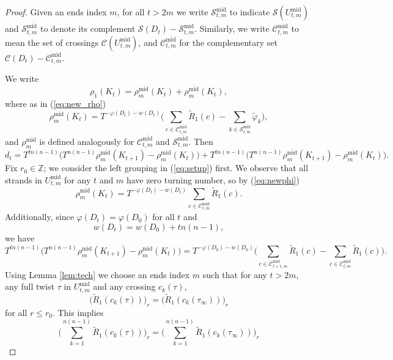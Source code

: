 \documentclass[10pt,a4paper]{amsart}
\newcommand{\Z}{\mathbb{Z}}
\begin{document}
	\begin{proof}
		Given an ends index $m$, for all $t > 2m$ we write $\mathcal{S}_{t,m}^\text{mid}$ to indicate $\mathcal{S}(U^\text{mid}_{t,m})$ and $\mathcal{S}_{t,m}^{\overline{\text{mid}}}$ to denote its complement $\mathcal{S}(D_t) - \mathcal{S}^\text{mid}_{t,m}$. Similarly, we write $\mathcal{C}_{t,m}^\text{mid}$ to mean the set of crossings $\mathcal{C}(U^\text{mid}_{t,m})$, and $\mathcal{C}_{t,m}^{\overline{\text{mid}}}$ for the complementary set $\mathcal{C}(D_t) - \mathcal{C}^\text{mid}_{t,m}$.
		
		We write
		$$
		\rho_1(K_t) = \rho^\text{mid}_m(K_t) + \rho^{\overline{\text{mid}}}_m(K_t),
		$$
		where as in (\ref{eq:new_rho})
		$$
		\rho^\text{mid}_m(K_t) = T^{-\varphi(D_t) -w(D_t)} \Big( \sum_{c \in \mathcal{C}_{t,m}^\text{mid}} \tilde{R}_1(c) - \sum_{k \in \mathcal{S}_{t,m}^\text{mid}} \tilde{\varphi}_k \Big),
		$$
		and $\rho^{\overline{\text{mid}}}_m$ is defined analogously for $\mathcal{C}_{t,m}^{\overline{\text{mid}}}$ and $\mathcal{S}_{t,m}^{\overline{\text{mid}}}$. Then
		\begin{equation}
			\label{eq:setup}
			d_t = T^{tn(n - 1)} \big(T^{n(n - 1)} \rho^\text{mid}_m(K_{t + 1}) -  \rho^\text{mid}_m(K_t)\big) + T^{tn(n - 1)}\big(T^{n(n - 1)} \rho^{\overline{\text{mid}}}_m(K_{t + 1}) -  \rho^{\overline{\text{mid}}}_m(K_t) \big).
		\end{equation}
		Fix $r_0 \in \Z$; we consider the left grouping in (\ref{eq:setup}) first. We observe that all strands in $U^\text{mid}_{t,m}$ for any $t$ and $m$ have zero turning number, so by (\ref{eq:newphi})
		$$
		\rho^\text{mid}_m(K_t) = T^{-\varphi(D_t) -w(D_t)} \sum_{c \in \mathcal{C}_{t,m}^\text{mid}} \tilde{R}_1(c).
		$$
		Additionally, since $\varphi(D_t) = \varphi(D_0)$ for all $t$ and
		$$
		w(D_t) = w(D_0) + tn(n - 1),
		$$
		we have
		\begin{equation}
			\label{eq:first_grp}
			T^{tn(n - 1)} \big(T^{n(n - 1)} \rho^\text{mid}_m(K_{t + 1}) -  \rho^\text{mid}_m(K_t)\big) = T^{-\varphi(D_0) -w(D_0)}\big(\sum_{c \in \mathcal{C}_{t + 1,m}^\text{mid}} \tilde{R}_1(c) - \sum_{c \in \mathcal{C}_{t,m}^\text{mid}} \tilde{R}_1(c)\big).
		\end{equation}
		Using Lemma \ref{lem:tech} we choose an ends index $m$ such that for any $t > 2m$, any full twist $\tau$ in $U^\text{mid}_{t,m}$ and any crossing $c_k(\tau)$,
		$$
		\big(\widetilde{R}_1(c_k(\tau))\big)_r = \big(\widetilde{R}_1(c_k(\tau_\infty))\big)_r
		$$
		for all $r \leq r_0$. This implies
		$$
		\big(\sum_{k = 1}^{n(n-1)} \widetilde{R}_1(c_k(\tau))\big)_r = \big(\sum_{k = 1}^{n(n-1)} \widetilde{R}_1(c_k(\tau_\infty))\big)_r
$$
\end{proof}
\end{document}
